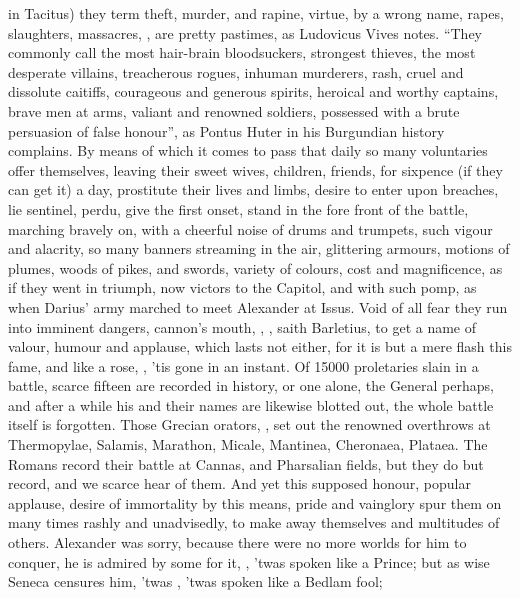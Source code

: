 in Tacitus) they term theft, murder, and rapine, virtue, by a wrong name,
rapes, slaughters, massacres, \etc{} , are pretty pastimes,
as Ludovicus Vives notes. \enquote{They commonly call the most
hair-brain bloodsuckers, strongest thieves, the most desperate villains,
treacherous rogues, inhuman murderers, rash, cruel and dissolute caitiffs,
courageous and generous spirits, heroical and worthy captains,
brave men at arms, valiant and renowned soldiers, possessed
with a brute persuasion of false honour}, as Pontus Huter in his Burgundian
history complains. By means of which it comes to pass that daily so many
voluntaries offer themselves, leaving their sweet wives, children, friends, for
sixpence (if they can get it) a day, prostitute their lives and limbs, desire
to enter upon breaches, lie sentinel, perdu, give the first onset, stand in the
fore front of the battle, marching bravely on, with a cheerful noise of drums
and trumpets, such vigour and alacrity, so many banners streaming in the air,
glittering armours, motions of plumes, woods of pikes, and swords, variety of
colours, cost and magnificence, as if they went in triumph, now victors to the
Capitol, and with such pomp, as when Darius' army marched to meet Alexander at
Issus. Void of all fear they run into imminent dangers, cannon's mouth, \etc{},
, saith
Barletius, to get a name of valour, humour and applause,
which lasts not either, for it is but a mere flash this fame, and like a rose,
, 'tis gone in an instant. Of 15\thinspace{}000
proletaries slain in a battle, scarce fifteen are recorded in history, or one
alone, the General perhaps, and after a while his and their names are likewise
blotted out, the whole battle itself is forgotten. Those Grecian orators,
, set out the renowned overthrows at
Thermopylae, Salamis, Marathon, Micale, Mantinea, Cheronaea, Plataea. The
Romans record their battle at Cannas, and Pharsalian fields, but they do but
record, and we scarce hear of them. And yet this supposed honour, popular
applause, desire of immortality by this means, pride and vainglory spur them on
many times rashly and unadvisedly, to make away themselves and multitudes of
others. Alexander was sorry, because there were no more worlds for him to
conquer, he is admired by some for it, ,
'twas spoken like a Prince; but as wise Seneca censures
him, 'twas , 'twas spoken like a Bedlam fool;

